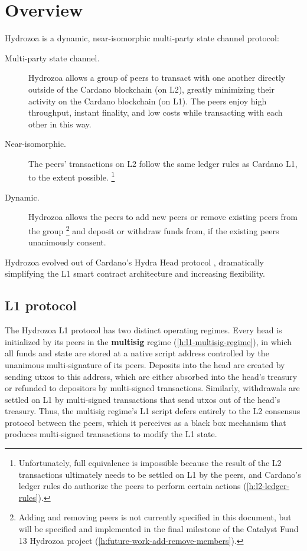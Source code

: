 \documentclass[../hydrozoa.tex]{subfiles}
\begin{document}
\chapter*{Overview}%
\label{h:overview-introduction}%
%

Hydrozoa is a dynamic, near-isomorphic multi-party state channel protocol:
\begin{description}
  \item[Multi-party state channel.] Hydrozoa allows a group of peers to transact with one another directly outside of the Cardano blockchain (on L2), greatly minimizing their activity on the Cardano blockchain (on L1).
    The peers enjoy high throughput, instant finality, and low costs while transacting with each other in this way.
  \item[Near-isomorphic.] The peers' transactions on L2 follow the same ledger rules as Cardano L1, to the extent possible.%
    \footnote{Unfortunately, full equivalence is impossible because the result of the L2 transactions ultimately needs to be settled on L1 by the peers, and Cardano's ledger rules do authorize the peers to perform certain actions (\cref{h:l2-ledger-rules}).}
  \item[Dynamic.] Hydrozoa allows the peers to add new peers or remove existing peers from the group%
    \footnote{Adding and removing peers is not currently specified in this document, but will be specified and implemented in the final milestone of the Catalyst Fund 13 Hydrozoa project \citep{FlerovskyCatalystMilestonesHydrozoa2024} (\cref{h:future-work-add-remove-members}).}
    and deposit or withdraw funds from, if the existing peers unanimously consent.
\end{description}
Hydrozoa evolved out of Cardano's Hydra Head protocol \citep{NagelEtAlHydraHeadV1Specification2024}, dramatically simplifying the L1 smart contract architecture and increasing flexibility.

\section*{L1 protocol}%
\label{h:overview-l1-protocol}%
%

The Hydrozoa L1 protocol has two distinct operating regimes.
Every head is initialized by its peers in the \textbf{multisig} regime (\cref{h:l1-multisig-regime}), in which all funds and state are stored at a native script address controlled by the unanimous multi-signature of its peers.
Deposits into the head are created by sending utxos to this address, which are either absorbed into the head's treasury or refunded to depositors by multi-signed transactions.
Similarly, withdrawals are settled on L1 by multi-signed transactions that send utxos out of the head's treasury.
Thus, the multisig regime's L1 script defers entirely to the L2 consensus protocol between the peers, which it perceives as a black box mechanism that produces multi-signed transactions to modify the L1 state.
\end{document}
